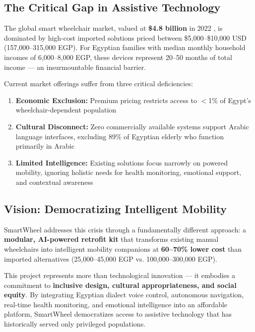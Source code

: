 \documentclass[12pt,a4paper]{report}
\begin{document}
\subsection{The Critical Gap in Assistive Technology}
The global smart wheelchair market, valued at \textbf{\$4.8 billion} in 2022
\cite{grandview_market}, is dominated by high-cost imported solutions priced between
\$5,000--\$10,000 USD (157,000--315,000 EGP). For Egyptian families with median monthly
household incomes of 6,000--8,000 EGP, these devices represent 20--50 months of total
income --- an insurmountable financial barrier.

Current market offerings suffer from three critical deficiencies:
\begin{enumerate}[leftmargin=*,itemsep=5pt]
    \item \textbf{Economic Exclusion:} Premium pricing restricts access to $<$1\% of
          Egypt's wheelchair-dependent population
    \item \textbf{Cultural Disconnect:} Zero commercially available systems support Arabic
          language interfaces, excluding 89\% of Egyptian elderly who function primarily
          in Arabic
    \item \textbf{Limited Intelligence:} Existing solutions focus narrowly on powered
          mobility, ignoring holistic needs for health monitoring, emotional support, and
          contextual awareness
\end{enumerate}

\subsection{Vision: Democratizing Intelligent Mobility}
SmartWheel addresses this crisis through a fundamentally different approach: a
\textbf{modular, AI-powered retrofit kit} that transforms existing manual wheelchairs into
intelligent mobility companions at \textbf{60--70\% lower cost} than imported alternatives
(25,000--45,000 EGP vs. 100,000--300,000 EGP).

This project represents more than technological innovation --- it embodies a commitment to
\textbf{inclusive design, cultural appropriateness, and social equity}. By integrating
Egyptian dialect voice control, autonomous navigation, real-time health monitoring, and
emotional intelligence into an affordable platform, SmartWheel democratizes access to
assistive technology that has historically served only privileged populations.
\end{document}
